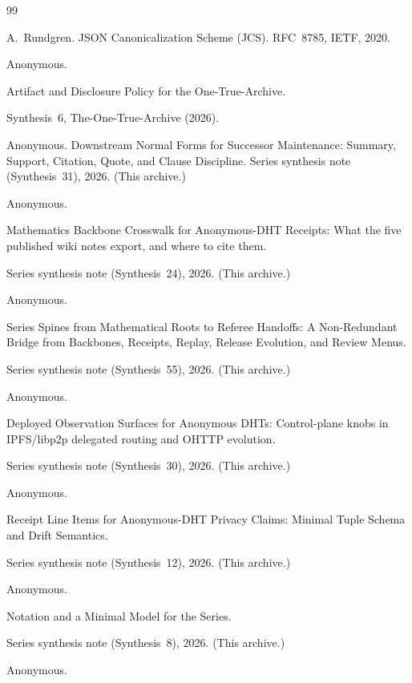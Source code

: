 \documentclass[11pt]{article}
\begin{document}
\begin{thebibliography}{99}\small


A.~Rundgren.
\newblock JSON Canonicalization Scheme (JCS).
\newblock RFC~8785, IETF, 2020.

Anonymous.

\newblock Artifact and Disclosure Policy for the One-True-Archive.

\newblock Synthesis~6, The-One-True-Archive (2026).

Anonymous.
\newblock Downstream Normal Forms for Successor Maintenance: Summary, Support, Citation, Quote, and Clause Discipline.
\newblock Series synthesis note (Synthesis~31), 2026. (This archive.)

Anonymous.

\newblock Mathematics Backbone Crosswalk for Anonymous-DHT Receipts: What the five published wiki notes export, and where to cite them.

\newblock Series synthesis note (Synthesis~24), 2026. (This archive.)

Anonymous.

\newblock Series Spines from Mathematical Roots to Referee Handoffs: A Non-Redundant Bridge from Backbones, Receipts, Replay, Release Evolution, and Review Menus.

\newblock Series synthesis note (Synthesis~55), 2026. (This archive.)

Anonymous.

\newblock Deployed Observation Surfaces for Anonymous DHTs: Control-plane knobs in IPFS/libp2p delegated routing and OHTTP evolution.

\newblock Series synthesis note (Synthesis~30), 2026. (This archive.)

Anonymous.

\newblock Receipt Line Items for Anonymous-DHT Privacy Claims: Minimal Tuple Schema and Drift Semantics.

\newblock Series synthesis note (Synthesis~12), 2026. (This archive.)

Anonymous.

\newblock Notation and a Minimal Model for the Series.

\newblock Series synthesis note (Synthesis~8), 2026. (This archive.)

Anonymous.


\end{thebibliography}
\end{document}
